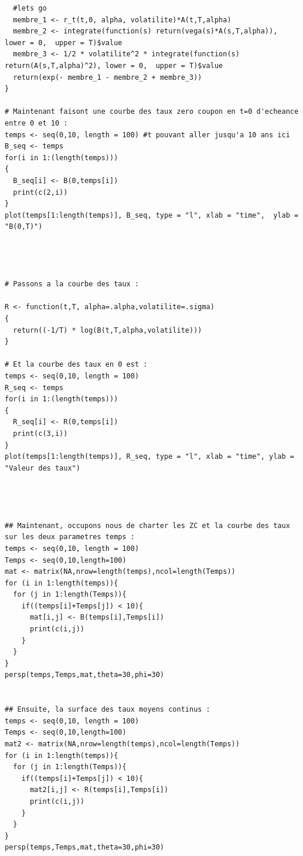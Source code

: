 \documentclass[11pt]{article}
\begin{document}
\begin{center}
\begin{lstlisting}
  #lets go
  membre_1 <- r_t(t,0, alpha, volatilite)*A(t,T,alpha)
  membre_2 <- integrate(function(s) return(vega(s)*A(s,T,alpha)), lower = 0,  upper = T)$value
  membre_3 <- 1/2 * volatilite^2 * integrate(function(s) return(A(s,T,alpha)^2), lower = 0,  upper = T)$value
  return(exp(- membre_1 - membre_2 + membre_3))
}

# Maintenant faisont une courbe des taux zero coupon en t=0 d'echeance entre 0 et 10 : 
temps <- seq(0,10, length = 100) #t pouvant aller jusqu'a 10 ans ici
B_seq <- temps
for(i in 1:(length(temps)))
{
  B_seq[i] <- B(0,temps[i])
  print(c(2,i))
}
plot(temps[1:length(temps)], B_seq, type = "l", xlab = "time",  ylab = "B(0,T)")




# Passons a la courbe des taux : 

R <- function(t,T, alpha=.alpha,volatilite=.sigma)
{
  return((-1/T) * log(B(t,T,alpha,volatilite)))
}

# Et la courbe des taux en 0 est : 
temps <- seq(0,10, length = 100)
R_seq <- temps
for(i in 1:(length(temps)))
{
  R_seq[i] <- R(0,temps[i])
  print(c(3,i))
}
plot(temps[1:length(temps)], R_seq, type = "l", xlab = "time", ylab = "Valeur des taux")




## Maintenant, occupons nous de charter les ZC et la courbe des taux sur les deux parametres temps : 
temps <- seq(0,10, length = 100)
Temps <- seq(0,10,length=100)
mat <- matrix(NA,nrow=length(temps),ncol=length(Temps))
for (i in 1:length(temps)){
  for (j in 1:length(Temps)){
    if((temps[i]+Temps[j]) < 10){
      mat[i,j] <- B(temps[i],Temps[i])
      print(c(i,j))
    }
  }
}
persp(temps,Temps,mat,theta=30,phi=30)


## Ensuite, la surface des taux moyens continus : 
temps <- seq(0,10, length = 100)
Temps <- seq(0,10,length=100)
mat2 <- matrix(NA,nrow=length(temps),ncol=length(Temps))
for (i in 1:length(temps)){
  for (j in 1:length(Temps)){
    if((temps[i]+Temps[j]) < 10){
      mat2[i,j] <- R(temps[i],Temps[i])
      print(c(i,j))
    }
  }
}
persp(temps,Temps,mat,theta=30,phi=30)
\end{lstlisting}
\end{center}
\end{document}
